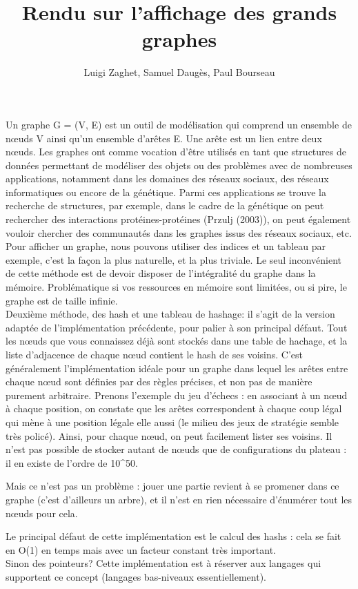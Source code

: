 \documentclass{article}
\title{Rendu sur l'affichage des grands graphes}
\author{Luigi Zaghet, Samuel Daugès, Paul Bourseau}
\begin{document}
\maketitle

Un graphe G = (V, E) est un outil de modélisation qui comprend un ensemble de nœuds
V ainsi qu’un ensemble d’arêtes E. Une arête est un lien entre deux nœuds. Les graphes ont
comme vocation d’être utilisés en tant que structures de données permettant de modéliser des
objets ou des problèmes avec de nombreuses applications, notamment dans les domaines des
réseaux sociaux, des réseaux informatiques ou encore de la génétique. Parmi ces applications se
trouve la recherche de structures, par exemple, dans le cadre de la génétique on peut rechercher
des interactions protéines-protéines (Przulj (2003)), on peut également vouloir chercher des
communautés dans les graphes issus des réseaux sociaux, etc.
Pour afficher un graphe, nous pouvons utiliser des indices et un tableau par exemple, c'est la façon la plus naturelle, et la plus triviale. Le seul inconvénient de cette méthode est de devoir disposer de l'intégralité du graphe dans la mémoire. Problématique si vos ressources en mémoire sont limitées, ou si pire, le graphe est de taille infinie.\\
Deuxième méthode, des hash et une tableau de hashage: il s'agit de la version adaptée de l'implémentation précédente, pour palier à son principal défaut. Tout les nœuds que vous connaissez déjà sont stockés dans une table de hachage, et la liste d'adjacence de chaque nœud contient le hash de ses voisins. C'est généralement l'implémentation idéale pour un graphe dans lequel les arêtes entre chaque nœud sont définies par des règles précises, et non pas de manière purement arbitraire. Prenons l'exemple du jeu d'échecs : en associant à un nœud à chaque position, on constate que les arêtes correspondent à chaque coup légal qui mène à une position légale elle aussi (le milieu des jeux de stratégie semble très policé). Ainsi, pour chaque nœud, on peut facilement lister ses voisins. Il n'est pas possible de stocker autant de nœuds que de configurations du plateau : il en existe de l'ordre de 10^{50}.

Mais ce n'est pas un problème : jouer une partie revient à se promener dans ce graphe (c'est d'ailleurs un arbre), et il n'est en rien nécessaire d'énumérer tout les nœuds pour cela.

Le principal défaut de cette implémentation est le calcul des hashs : cela se fait en O(1)
en temps mais avec un facteur constant très important. \\
Sinon des pointeurs?
Cette implémentation est à réserver aux langages qui supportent ce concept (langages bas-niveaux essentiellement).
\end{document}
